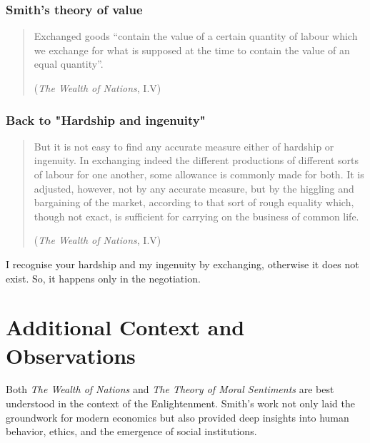         \subsubsection{Smith’s theory of value}

            \begin{quote}
                Exchanged goods “contain the value of a certain quantity of labour which we exchange for what is supposed at the time to contain the value of an equal quantity”.

                (\textit{The Wealth of Nations}, I.V)
            \end{quote} 

        \subsubsection{Back to "Hardship and ingenuity"}

            \begin{quote}
                But it is not easy to find any accurate measure either of hardship or ingenuity. In exchanging indeed the different productions of different sorts of labour for one another, some allowance is commonly made for both. It is adjusted, however, not by any accurate measure, but by the higgling and bargaining of the market, according to that sort of rough equality which, though not exact, is sufficient for carrying on the business of common life.

                (\textit{The Wealth of Nations}, I.V)
            \end{quote}

            \begin{remark}
                I recognise your hardship and my ingenuity by exchanging, otherwise it does not exist. So, it happens only in the negotiation.
            \end{remark}

\section*{Additional Context and Observations}

    \begin{remark}
        Both \textit{The Wealth of Nations} and \textit{The Theory of Moral Sentiments} are best understood in the context of the Enlightenment. Smith’s work not only laid the groundwork for modern economics but also provided deep insights into human behavior, ethics, and the emergence of social institutions.
    \end{remark}


